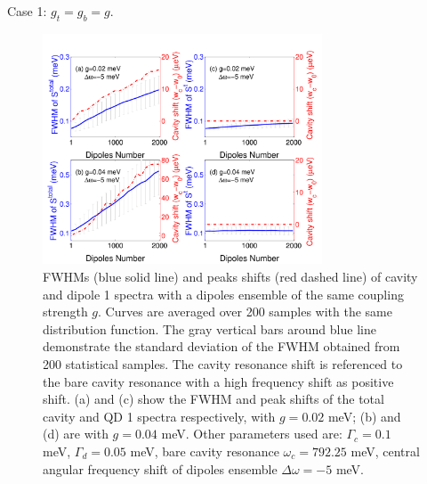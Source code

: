 \documentclass{beamer}
\begin{document}
\begin{frame}{Case 1: $ g_t=g_b=g$.}
\begin{figure}[htp]%
\centering
\begin{center}
\includegraphics[width=0.74\textwidth]{./Figs/fwhm_wdrand5s20_E0dot2-0dot4_qd2000_stat200}
\end{center}
\caption[Spectral modification by pure background dipoles.]{ FWHMs (blue solid line) and peaks shifts (red dashed line) of cavity and dipole 1 spectra with a dipoles ensemble of the same coupling strength $g$. Curves are averaged over 200 samples with the same distribution function. The gray vertical bars around blue line demonstrate the standard deviation of the FWHM obtained from 200 statistical samples. The cavity resonance shift is referenced to the bare cavity resonance with a high frequency shift as positive shift. (a) and (c) show the FWHM and peak shifts of the total cavity and QD 1 spectra respectively, with $g=0.02$ meV; (b) and (d) are with $g=0.04$ meV. Other parameters used are: $\Gamma_c=0.1$ meV, $\Gamma_d=0.05$ meV, bare cavity resonance $\omega_c=792.25$ meV, central angular frequency shift of dipoles ensemble $\Delta\omega=-5$ meV. }
\label{fwhm_wdrand5s20_E0.2-0.4_qd2000_stat200}
\end{figure}

\end{frame}
\end{document}
